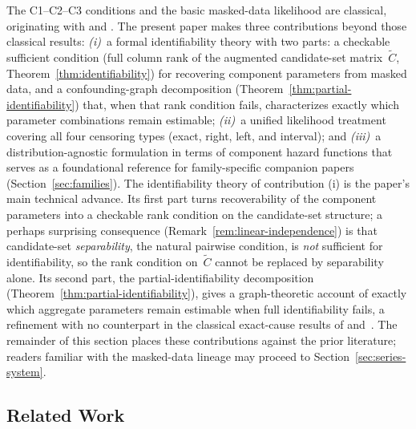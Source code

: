 \documentclass[11pt]{article}
\theoremstyle{definition}
\theoremstyle{plain}
\begin{document}
The C1--C2--C3 conditions and the basic masked-data likelihood are
classical, originating with \citet{miyakawa1984} and \citet{Usher-1988}.
The present paper makes three contributions beyond those classical
results:
\emph{(i)}~a formal identifiability theory with two parts: a checkable
sufficient condition (full column rank of the augmented candidate-set
matrix~$\tilde{C}$, Theorem~\ref{thm:identifiability}) for recovering
component parameters from masked data, and a confounding-graph
decomposition (Theorem~\ref{thm:partial-identifiability}) that, when
that rank condition fails, characterizes exactly which parameter
combinations remain estimable;
\emph{(ii)}~a unified likelihood treatment covering all four censoring
types (exact, right, left, and interval); and
\emph{(iii)}~a distribution-agnostic formulation in terms of component
hazard functions that serves as a foundational reference for
family-specific companion papers (Section~\ref{sec:families}).
The identifiability theory of contribution (i) is the paper's main
technical advance.
Its first part turns recoverability of the component parameters into a
checkable rank condition on the candidate-set structure; a perhaps
surprising consequence (Remark~\ref{rem:linear-independence}) is that
candidate-set \emph{separability}, the natural pairwise condition, is
\emph{not} sufficient for identifiability, so the rank condition
on~$\tilde{C}$ cannot be replaced by separability alone.
Its second part, the partial-identifiability decomposition
(Theorem~\ref{thm:partial-identifiability}), gives a graph-theoretic
account of exactly which aggregate parameters remain estimable when
full identifiability fails, a refinement with no counterpart in the
classical exact-cause results of \citet{meilijson1981}
and~\citet{nowik1990}.
The remainder of this section places these contributions against the
prior literature; readers familiar with the masked-data lineage may
proceed to Section~\ref{sec:series-system}.

\subsection{Related Work}
\label{sec:related-work}
\end{document}
